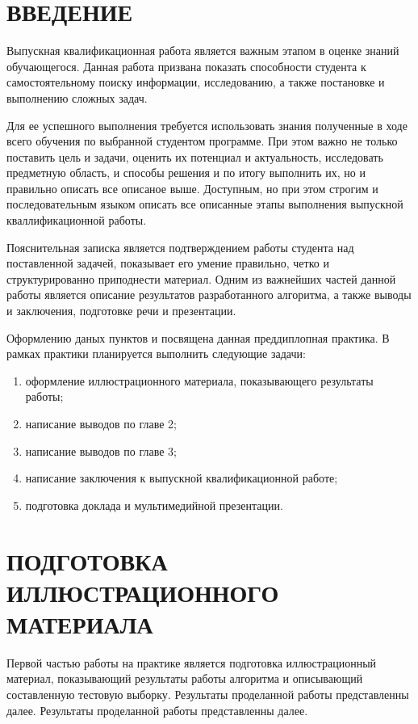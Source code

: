 \documentclass[14pt, a4paper]{extreport}
\begin{document}
	\firstpage
	\renewcommand\contentsname{ОГЛАВЛЕНИЕ}
	\tableofcontents
	\thispagestyle{empty}
\chapter* {ВВЕДЕНИЕ} 
	Выпускная квалификационная работа является важным этапом в оценке знаний обучающегося. Данная работа призвана показать способности студента к самостоятельному поиску информации, исследованию, а также постановке и выполнению сложных задач. 
	
	Для ее успешного выполнения требуется использовать знания полученные в ходе всего обучения по выбранной студентом программе. При этом важно не только поставить цель и задачи, оценить их потенциал и актуальность, исследовать предметную область, и способы решения и по итогу выполнить их, но и правильно описать все описаное выше. Доступным, но при этом строгим и последовательным языком описать все описанные этапы выполнения выпускной кваллификационной работы.
	
	Пояснительная записка является подтверждением работы студента над поставленной задачей, показывает его умение правильно, четко и структурированно приподнести материал. Одним из важнейших частей данной работы является описание результатов разработанного алгоритма, а также выводы и заключения, подготовке речи и презентации.
	
	Оформлению даных пунктов и посвящена данная преддиплопная практика. В рамках практики планируется выполнить следующие задачи:
	\begin{enumerate}[label={\arabic*)}]
		\item оформление иллюстрационного материала, показывающего результаты работы;
		\item написание выводов по главе 2;
		\item написание выводов по главе 3;
		\item написание заключения к выпускной квалификационной работе;
		\item подготовка доклада и мультимедийной презентации.
	\end{enumerate} 
\chapter {ПОДГОТОВКА ИЛЛЮСТРАЦИОННОГО МАТЕРИАЛА}
	Первой частью работы на практике является подготовка иллюстрационный материал, показывающий результаты работы алгоритма и описывающий составленную тестовую выборку. Результаты проделанной работы представленны далее. Результаты проделанной работы представленны далее.
	
\end{document}
